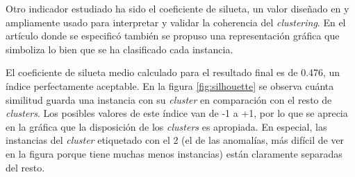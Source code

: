 Otro indicador estudiado ha sido el coeficiente de silueta, un valor diseñado en \cite{Rousseeuw_1987} y ampliamente usado para interpretar y validar la coherencia del \emph{clustering}.
En el artículo donde se especificó también se propuso una representación gráfica que simboliza lo bien que se ha clasificado cada instancia.

El coeficiente de silueta medio calculado para el resultado final es de 0.476, un índice perfectamente aceptable.
En la figura \ref{fig:silhouette} se observa cuánta similitud guarda una instancia con su \emph{cluster} en comparación con el resto de \emph{clusters}.
Los posibles valores de este índice van de -1 a +1, por lo que se aprecia en la gráfica que la disposición de los \emph{clusters} es apropiada.
En especial, las instancias del \emph{cluster} etiquetado con el 2 (el de las anomalías, más difícil de ver en la figura porque tiene muchas menos instancias) están claramente separadas del resto.

